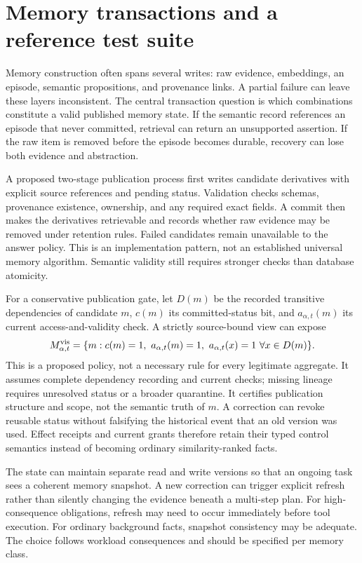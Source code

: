 \section{Memory transactions and a reference test suite}\label{sec:C14:transactions}
Memory construction often spans several writes: raw evidence, embeddings, an episode, semantic propositions, and provenance links. A partial failure can leave these layers inconsistent. The central transaction question is which combinations constitute a valid published memory state. If the semantic record references an episode that never committed, retrieval can return an unsupported assertion. If the raw item is removed before the episode becomes durable, recovery can lose both evidence and abstraction.

A proposed two-stage publication process first writes candidate derivatives with explicit source references and pending status. Validation checks schemas, provenance existence, ownership, and any required exact fields. A commit then makes the derivatives retrievable and records whether raw evidence may be removed under retention rules. Failed candidates remain unavailable to the answer policy. This is an implementation pattern, not an established universal memory algorithm. Semantic validity still requires stronger checks than database atomicity.

For a conservative publication gate, let $D(m)$ be the recorded transitive dependencies of candidate $m$, $c(m)$ its committed-status bit, and $a_{\alpha,t}(m)$ its current access-and-validity check. A strictly source-bound view can expose
\begin{equation}
 M_{\alpha,t}^{\rm vis}=
 \{m:c(m)=1,\ a_{\alpha,t}(m)=1,
        \ a_{\alpha,t}(x)=1\ \forall x\in D(m)\}.
\end{equation}
This is a proposed policy, not a necessary rule for every legitimate aggregate. It assumes complete dependency recording and current checks; missing lineage requires unresolved status or a broader quarantine. It certifies publication structure and scope, not the semantic truth of $m$. A correction can revoke reusable status without falsifying the historical event that an old version was used. Effect receipts and current grants therefore retain their typed control semantics instead of becoming ordinary similarity-ranked facts.

The state can maintain separate read and write versions so that an ongoing task sees a coherent memory snapshot. A new correction can trigger explicit refresh rather than silently changing the evidence beneath a multi-step plan. For high-consequence obligations, refresh may need to occur immediately before tool execution. For ordinary background facts, snapshot consistency may be adequate. The choice follows workload consequences and should be specified per memory class.

